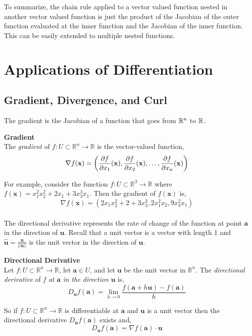 \documentclass[12pt]{article}
\begin{document}
To summarize, the chain rule applied to a vector valued function nested in another vector valued function is just the product of the Jacobian of the outer function evaluated at the inner function and the Jacobian of the inner function. This can be easily extended to multiple nested functions. \\ 

\pagebreak

\section{Applications of Differentiation}

\subsection{Gradient, Divergence, and Curl}

The gradient is the Jacobian of a function that goes from $\mathbb{R}^n$ to $\mathbb{R}$. \\

\begin{framed}
\textbf{Gradient} \\
The \emph{gradient} of $f:U\subset\mathbb{R}^n\rightarrow\mathbb{R}$ is the vector-valued function,
\[
\nabla f(\mathbf{x}) = \left( \frac{\partial f}{\partial x_1}(\mathbf{x}), \frac{\partial f}{\partial x_2}(\mathbf{x}), \ldots, \frac{\partial f}{\partial x_n}(\mathbf{x}) \right)
\]
\end{framed}

 For example, consider the function $f:U\subset\mathbb{R}^3\rightarrow\mathbb{R}$ where $f(\mathbf{x}) = x_1^2x_2^2 + 2x_1 + 3x_3^3x_1$. Then the gradient of $f(\mathbf{x})$ is, 
\[
\nabla f(\mathbf{x}) = (2x_1x_2^2 + 2 + 3x_3^3, 2x_1^2x_2, 9x_3^2x_1)
\] \\

The directional derivative represents the rate of change of the function at point $\mathbf{a}$ in the direction of $\mathbf{u}$. Recall that a unit vector is a vector with length 1 and $\hat{\mathbf{u}} = \frac{\mathbf{u}}{||\mathbf{u}||}$ is the unit vector in the direction of $\mathbf{u}$. \\

\begin{framed}
\textbf{Directional Derivative} \\
Let $f:U\subset\mathbb{R}^n\rightarrow\mathbb{R}$, let $\mathbf{a}\in U$, and let $\mathbf{u}$ be the unit vector in $\mathbb{R}^n$. The \emph{directional derivative} of $f$ \emph{at $\mathbf{a}$ in the direction $\mathbf{u}$} is,
\[
D_{\mathbf{u}}f(\mathbf{a}) = \lim_{h\rightarrow0} \frac{f(\mathbf{a}+h\mathbf{u})-f(\mathbf{a})}{h}
\] 

So if $f:U\subset\mathbb{R}^n\rightarrow\mathbb{R}$ is differentiable at $\mathbf{a}$ and $\mathbf{u}$ is a unit vector then the directional derivative $D_{\mathbf{u}}f(\mathbf{a})$ exists and,
\[
D_{\mathbf{u}}f(\mathbf{a}) = \nabla f(\mathbf{a})\cdot\mathbf{u} 
\]
\end{framed} 
\end{document}
